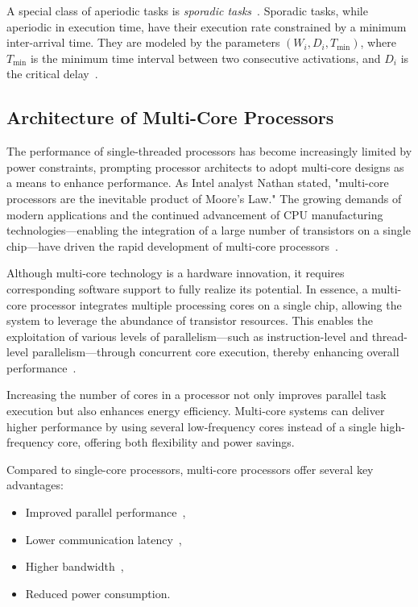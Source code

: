 \documentclass[conference]{IEEEtran}
\begin{document}
A special class of aperiodic tasks is \textit{sporadic tasks}~\cite{butazo99}. Sporadic tasks, while aperiodic in execution time, have their execution rate constrained by a minimum inter-arrival time. They are modeled by the parameters $(W_i, D_i, T_{\text{min}})$, where $T_{\text{min}}$ is the minimum time interval between two consecutive activations, and $D_i$ is the critical delay~\cite{AbdallahGB24}.




\subsection{Architecture of Multi-Core Processors}
\label{subsec: architecture of multi-core processors}

The performance of single-threaded processors has become increasingly limited by power constraints, prompting processor architects to adopt multi-core designs as a means to enhance performance. As Intel analyst Nathan stated, "multi-core processors are the inevitable product of Moore's Law." The growing demands of modern applications and the continued advancement of CPU manufacturing technologies—enabling the integration of a large number of transistors on a single chip—have driven the rapid development of multi-core processors~\cite{6234619}.

Although multi-core technology is a hardware innovation, it requires corresponding software support to fully realize its potential. In essence, a multi-core processor integrates multiple processing cores on a single chip, allowing the system to leverage the abundance of transistor resources. This enables the exploitation of various levels of parallelism—such as instruction-level and thread-level parallelism—through concurrent core execution, thereby enhancing overall performance~\cite{6234619}.

Increasing the number of cores in a processor not only improves parallel task execution but also enhances energy efficiency. Multi-core systems can deliver higher performance by using several low-frequency cores instead of a single high-frequency core, offering both flexibility and power savings.

Compared to single-core processors, multi-core processors offer several key advantages:
\begin{itemize}
    \item Improved parallel performance~\cite{h2000},
    \item Lower communication latency~\cite{lx2015},
    \item Higher bandwidth~\cite{997877},
    \item Reduced power consumption.
\end{itemize}
\end{document}
